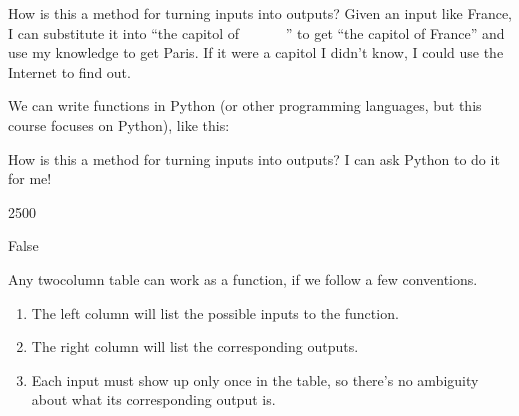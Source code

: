 \documentclass[letterpaper,10pt,english]{sphinxmanual}
\begin{document}
How is this a method for turning inputs into outputs?  Given an input like France, I can substitute it into “the capitol of        ” to get “the capitol of France” and use my knowledge to get Paris.  If it were a capitol I didn’t know, I could use the Internet to find out.

 We can write functions in Python (or other programming languages, but this course focuses on Python), like this:

\begin{sphinxVerbatim}[commandchars=\\\{\}]
    
     

    
       
\end{sphinxVerbatim}

How is this a method for turning inputs into outputs?  I can ask Python to do it for me!

\begin{sphinxVerbatim}[commandchars=\\\{\}]
\end{sphinxVerbatim}

\begin{sphinxVerbatim}[commandchars=\\\{\}]
2500
\end{sphinxVerbatim}

\begin{sphinxVerbatim}[commandchars=\\\{\}]
  
\end{sphinxVerbatim}

\begin{sphinxVerbatim}[commandchars=\\\{\}]
False
\end{sphinxVerbatim}

 Any two\sphinxhyphen{}column table can work as a function, if we follow a few conventions.
\begin{enumerate}
%
\item {} 
The left column will list the possible inputs to the function.

\item {} 
The right column will list the corresponding outputs.

\item {} 
Each input must show up only once in the table, so there’s no ambiguity about what its corresponding output is.

\end{enumerate}
\end{document}
